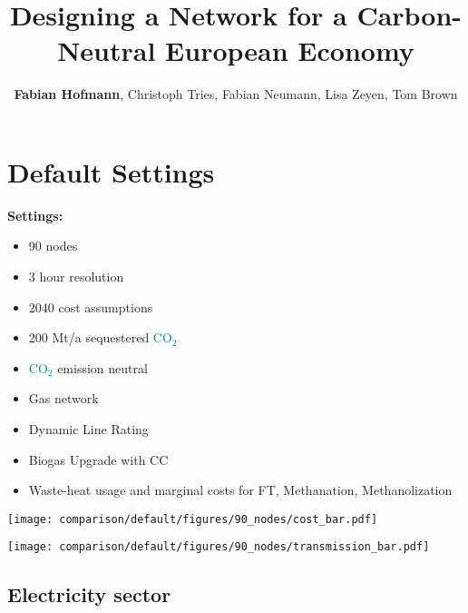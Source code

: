 \documentclass[12pt, aspectratio=169]{beamer}
\title{Designing a \carbon{} Network for a Carbon-Neutral European Economy}
\author{\textbf{Fabian Hofmann}, Christoph Tries, Fabian Neumann, Lisa Zeyen, Tom Brown}
\institute{Technical University Berlin}
\date{}
\newcommand{\carbon}{\textcolor{teal}{CO$_2$}}
\begin{document}
\begin{frame}[plain]
    \titlepage
\end{frame}


\section*{Default Settings}

\begin{frame}
    \textbf{Settings:}
    \begin{itemize}
        \item 90 nodes
        \item 3 hour resolution
        \item 2040 cost assumptions
        \item 200 Mt/a sequestered \carbon{}
        \item \carbon{} emission neutral
        \item Gas network
        \item Dynamic Line Rating
        \item Biogas Upgrade with CC
        \item Waste-heat usage and marginal costs for FT, Methanation, Methanolization
    \end{itemize}
\end{frame}

\begin{frame}
        \texttt{[image: comparison/default/figures/90\_nodes/cost\_bar.pdf]}
\end{frame}

\begin{frame}
    \texttt{[image: comparison/default/figures/90\_nodes/transmission\_bar.pdf]}
\end{frame}




\subsection*{Electricity sector}
\end{document}
